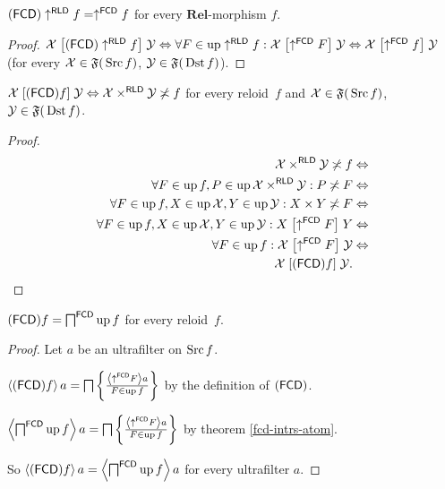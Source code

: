 \begin{prop}
\label{fcd-discr}$(\mathsf{FCD})\uparrow^{\mathsf{RLD}}f=\uparrow^{\mathsf{FCD}}f$
for every $\mathbf{Rel}$-morphism $f$.\end{prop}
\begin{proof}
$\mathcal{X}\mathrel{\left[(\mathsf{FCD})\uparrow^{\mathsf{RLD}}f\right]}\mathcal{Y}\Leftrightarrow\forall F\in\operatorname{up}\uparrow^{\mathsf{RLD}}f:\mathcal{X}\mathrel{\left[\uparrow^{\mathsf{FCD}}F\right]}\mathcal{Y}\Leftrightarrow\mathcal{X}\mathrel{\left[\uparrow^{\mathsf{FCD}}f\right]}\mathcal{Y}$
(for every $\mathcal{X}\in\mathfrak{F(}\operatorname{Src} f)$, $\mathcal{Y}\in\mathfrak{F(}\operatorname{Dst} f)$).\end{proof}
\begin{thm}
$\mathcal{X}\mathrel{\left[(\mathsf{FCD}) f\right]}\mathcal{Y}\Leftrightarrow\mathcal{X}\times^{\mathsf{RLD}}\mathcal{Y}\not\asymp f$
for every reloid~$f$ and $\mathcal{X}\in\mathfrak{F(}\operatorname{Src} f)$,
$\mathcal{Y}\in\mathfrak{F(}\operatorname{Dst} f)$.\end{thm}
\begin{proof}
~
\begin{align*}
\mathcal{X}\times^{\mathsf{RLD}}\mathcal{Y}\not\asymp f & \Leftrightarrow\\
\forall F\in\operatorname{up} f,P\in\operatorname{up}\mathcal{X}\times^{\mathsf{RLD}}\mathcal{Y}:P\not\asymp F & \Leftrightarrow\\
\forall F\in\operatorname{up} f,X\in\operatorname{up}\mathcal{X},Y\in\operatorname{up}\mathcal{Y}:X\times Y\not\asymp F & \Leftrightarrow\\
\forall F\in\operatorname{up} f,X\in\operatorname{up}\mathcal{X},Y\in\operatorname{up}\mathcal{Y}:X\mathrel{\left[\uparrow^{\mathsf{FCD}}F\right]}Y & \Leftrightarrow\\
\forall F\in\operatorname{up} f:\mathcal{X}\mathrel{\left[\uparrow^{\mathsf{FCD}}F\right]}\mathcal{Y} & \Leftrightarrow\\
\mathcal{X}\mathrel{\left[(\mathsf{FCD}) f\right]}\mathcal{Y}.
\end{align*}
\end{proof}
\begin{thm}
\label{fcd-as-meet}$(\mathsf{FCD}) f=\bigsqcap^{\mathsf{FCD}}\operatorname{up} f$ for
every reloid~$f$.\end{thm}
\begin{proof}
Let $a$ be an ultrafilter on $\operatorname{Src} f$.

$\left\langle (\mathsf{FCD}) f\right\rangle a=\bigsqcap\left\{ \frac{\left\langle \uparrow^{\mathsf{FCD}}F\right\rangle a}{F\in\operatorname{up} f}\right\}$
by the definition of $(\mathsf{FCD})$.

$\left\langle \bigsqcap^{\mathsf{FCD}}\operatorname{up} f\right\rangle a=\bigsqcap\left\{ \frac{\left\langle \uparrow^{\mathsf{FCD}}F\right\rangle a}{F\in\operatorname{up} f}\right\}$
by theorem \ref{fcd-intrs-atom}.

So $\left\langle (\mathsf{FCD}) f\right\rangle a=\left\langle \bigsqcap^{\mathsf{FCD}}\operatorname{up} f\right\rangle a$ for
every ultrafilter $a$.\end{proof}

